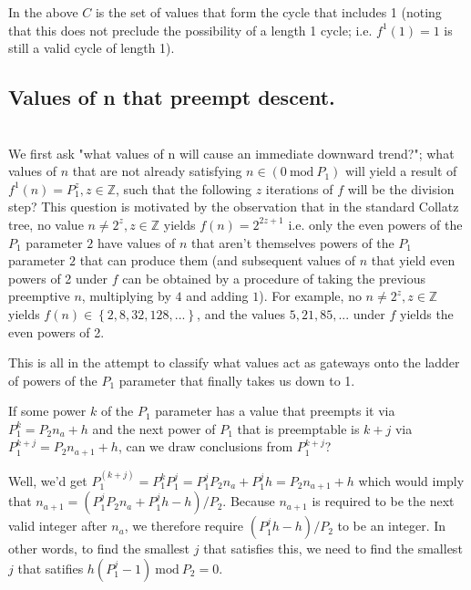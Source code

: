 \documentclass[12pt,a4paper]{amsart}
\numberwithin{equation}{section}
\theoremstyle{plain}
\theoremstyle{definition}
\begin{document}
In the above $C$ is the set of values that form the cycle that includes 1 (noting that this does not preclude the possibility of a length 1 cycle; i.e. $f^{1} \left  ( 1 \right ) = 1$ is still a valid cycle of length 1).

\subsection{Values of n that preempt descent.} \hfill\\

We first ask "what values of n will cause an immediate downward trend?"; what values of $n$ that are not already satisfying $n \in \left ( 0\:\mathrm{mod}\:P_{1} \right )$ will yield a result of $f^{1} \left ( n \right ) = P^{z}_{1}, z \in \mathbb{Z}$, such that the following $z$ iterations of $f$ will be the division step? This question is motivated by the observation that in the standard Collatz tree, no value $n \neq 2^{z}, z \in \mathbb{Z}$ yields $f \left ( n \right ) = 2^{2z+1}$ i.e. only the even powers of the $P_1$ parameter $2$ have values of $n$ that aren't themselves powers of the $P_1$ parameter $2$ that can produce them (and subsequent values of $n$ that yield even powers of 2 under $f$ can be obtained by a procedure of taking the previous preemptive $n$, multiplying by $4$ and adding $1$). For example, no $n \neq 2^{z}, z \in \mathbb{Z}$ yields $f \left ( n \right ) \in \left \{ 2, 8, 32, 128, ... \right \}$, and the values $5, 21, 85, ...$ under $f$ yields the even powers of 2.

This is all in the attempt to classify what values act as gateways onto the ladder of powers of the $P_1$ parameter that finally takes us down to 1.

If some power $k$ of the $P_1$ parameter has a value that preempts it via $P^{k}_{1} = P_{2}n_{a} + h$ and the next power of $P_1$ that is preemptable is $k+j$ via $P^{k+j}_{1} = P_{2}n_{a+1} + h$, can we draw conclusions from $P^{k+j}_{1}$?

 Well, we'd get $P^{\left ( k+j \right )}_{1} = P^{k}_{1}P^{j}_{1} = P^{j}_{1}P_{2}n_{a} + P^{j}_{1}h = P_{2}n_{a+1} + h$ which would imply that $n_{a+1} = \left ( P^{j}_{1}P_{2}n_{a} + P^{j}_{1}h - h\right )/P_{2}$. Because $n_{a+1}$ is required to be the next valid integer after $n_a$, we therefore require $\left ( P^{j}_{1}h - h \right )/P_2$ to be an integer. In other words, to find the smallest $j$ that satisfies this, we need to find the smallest $j$ that satifies $h \left ( P^{j}_{1} - 1 \right )\:\mathrm{mod}\:P_{2} = 0$.
\end{document}
